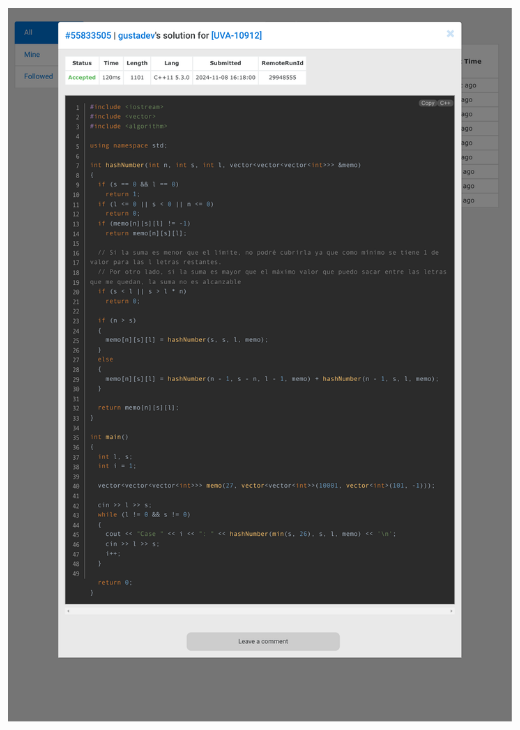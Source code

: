 \documentclass[a4paper, 12pt]{article}
\begin{document}
\includegraphics[clip, trim=40 0 40 25, width=17cm]{10912/submit.pdf}\vspace{-2cm}
\end{document}
